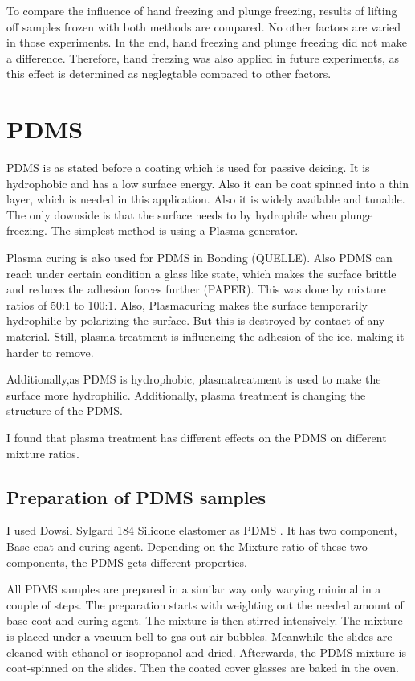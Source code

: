 To compare the influence of hand freezing and plunge freezing, results of lifting off samples frozen with both methods are compared. No other factors are varied in those experiments. In the end, hand freezing and plunge freezing did not make a difference. Therefore, hand freezing was also applied in future experiments, as this effect is determined as neglegtable compared to other factors.

\section{PDMS}

PDMS is as stated before a coating which is used for passive deicing. It is hydrophobic and has a low surface energy. Also it can be coat spinned into a thin layer, which is needed in this application. Also it is widely available and tunable. The only downside is that the surface needs to by hydrophile when plunge freezing. The simplest method is using a Plasma generator.

Plasma curing is also used for PDMS in Bonding (QUELLE). Also PDMS can reach under certain condition a glass like state, which makes the surface brittle and reduces the adhesion forces further (PAPER). This was done by mixture ratios of 50:1 to 100:1. Also, Plasmacuring makes the surface temporarily hydrophilic by polarizing the surface. But this is destroyed by contact of any material. Still, plasma treatment is influencing the adhesion of the ice, making it harder to remove.


Additionally,as PDMS is hydrophobic, plasmatreatment is used to make the surface more hydrophilic. Additionally, plasma treatment is changing the structure of the PDMS. 

I found that plasma treatment has different effects on the PDMS on different mixture ratios. 

\subsection{Preparation of PDMS samples}

I used Dowsil Sylgard 184 Silicone elastomer as PDMS \cite{DOW.}. It has two component, Base coat and curing agent. Depending on the Mixture ratio of these two components, the PDMS gets different properties. 

All PDMS samples are prepared in a similar way only warying minimal in a couple of steps. The preparation starts with weighting out the needed amount of base coat and curing agent. The mixture is then stirred intensively. The mixture is placed under a vacuum bell to gas out air bubbles. Meanwhile the slides are cleaned with ethanol or isopropanol and dried. Afterwards, the PDMS mixture is coat-spinned on the slides. Then the coated cover glasses are baked in the oven.

